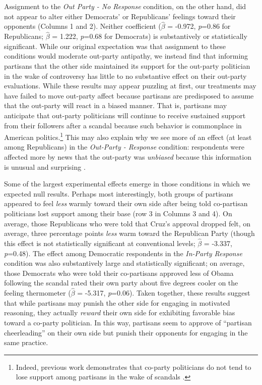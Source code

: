 \documentclass[12pt, letterpaper]{article}
\begin{document}
\bigskip
Assignment to the \textit{Out Party - No Response} condition, on the other hand, did not appear to alter either Democrats' or Republicans' feelings toward their opponents (Columns 1 and 2). Neither coefficient ($\hat{\beta}$ = -0.972, \textit{p}=0.86 for Republicans; $\hat{\beta}$ = 1.222, \textit{p}=0.68 for Democrats) is substantively or statistically significant. While our original expectation was that assignment to these conditions would moderate out-party antipathy, we instead find that informing partisans that the other side maintained its support for the out-party politician in the wake of controversy has little to no substantive effect on their out-party evaluations. While these results may appear puzzling at first, our treatments may have failed to move out-party affect because partisans are predisposed to assume that the out-party will react in a biased manner. That is, partisans may anticipate that out-party politicians will continue to receive sustained support from their followers after a scandal because such behavior is commonplace in American politics.\footnote{Indeed, previous work demonstrates that co-party politicians do not tend to lose support among partisans in the wake of scandals \citep{ahlersood_2014}.} This may also explain why we see more of an effect (at least among Republicans) in the \textit{Out-Party - Response} condition: respondents were affected more by news that the out-party was \textit{unbiased} because this information is unusual and surprising \citep[e.g.,][]{maheswaranchaiken_2011}.

Some of the largest experimental effects emerge in those conditions in which we expected null results. Perhaps most interestingly, both groups of partisans appeared to feel \textit{less} warmly toward their own side after being told co-partisan politicians lost support among their base (row 3 in Columns 3 and 4). On average, those Republicans who were told that Cruz's approval dropped felt, on average, three percentage points \textit{less} warm toward the Republican Party (though this effect is not statistically significant at conventional levels; $\hat{\beta}$ = -3.337, \textit{p}=0.48). The effect among Democratic respondents in the \textit{In-Party Response} condition was also substantively large and statistically significant; on average, those Democrats who were told their co-partisans approved less of Obama following the scandal rated their own party about five degrees cooler on the feeling thermometer ($\hat{\beta}$ = -5.317, \textit{p}=0.06). Taken together, these results suggest that while partisans may punish the other side for engaging in motivated reasoning, they actually \textit{reward} their own side for exhibiting favorable bias toward a co-party politician. In this way, partisans seem to approve of ``partisan cheerleading'' \citep{bullocketal_2015} on their own side but punish their opponents for engaging in the same practice. 
\end{document}
